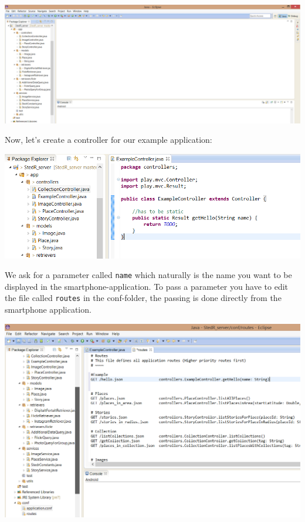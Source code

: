 \documentclass[11pt,a4paper,oneside]{article}
\begin{document}
\begin{center}
\includegraphics[scale=0.4]{guide/eclipse1.png} 
\end{center}

Now, let's create a controller for our example application:


\begin{center}
\includegraphics[scale=0.7]{guide/eclipse2.png} 
\end{center}

We ask for a parameter called \texttt{name} which naturally is the name you want to be displayed in the smartphone-application. To pass a parameter you have to edit the file called \texttt{routes} in the conf-folder, the passing is done directly from the smartphone application.

\begin{center}
\includegraphics[scale=0.5]{guide/eclipse3.png} 
\end{center}
\end{document}
